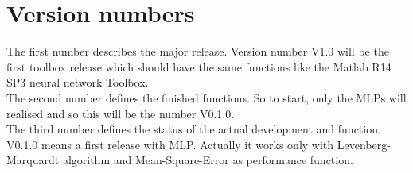 \section{Version numbers}

The first number describes the major release. Version number V1.0 will be the first toolbox release which should have the same functions like the Matlab R14 SP3 neural network Toolbox.\\

The second number defines the finished functions. So to start, only the MLPs will realised and so this will be the number V0.1.0.\\

The third number defines the status of the actual development and function. V0.1.0 means a first release with MLP. Actually it works only with Levenberg-Marquardt algorithm and Mean-Square-Error as performance function.